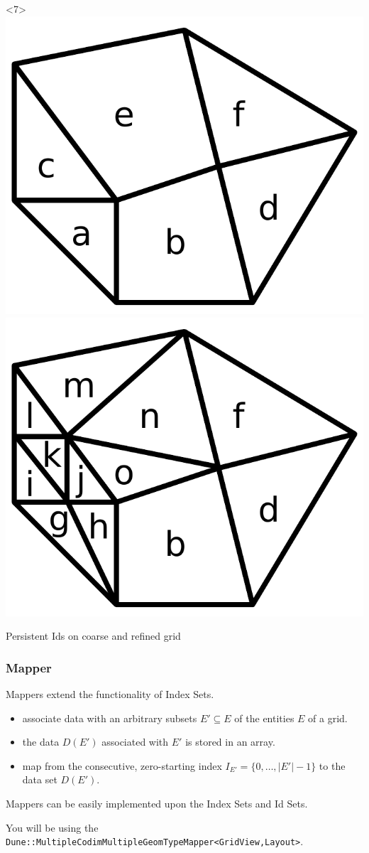 \documentclass[ignorenonframetext,11pt]{beamer}
\theoremstyle{definition}
\begin{document}
\begin{frame}
\begin{overlayarea}{\linewidth}{0.45\linewidth}
\begin{center}
    \begin{onlyenv}<7>
      \includegraphics[width=0.4\linewidth]{index-id0}
      \hfill
      \includegraphics[width=0.4\linewidth]{index-id1}\par
      Persistent Ids on coarse and refined grid\par
    \end{onlyenv}

    \end{center}
  \end{overlayarea}
\end{frame}

\begin{frame} \frametitle{Mapper}
  Mappers extend the functionality of Index Sets.

  \begin{itemize}
  \item associate data with an arbitrary subsets $E'\subseteq E$
    of the entities $E$ of a grid.
  \item the data $D(E')$ associated with
    $E'$ is stored in an array.
  \item map from the consecutive, zero-starting index $I_{E'} =
    \{0, \ldots, |E'|-1\}$ to the data set $D(E')$.
  \end{itemize}

  Mappers can be easily implemented upon the Index Sets and Id Sets.

  You will be using the
  \footnotesize
  \lstinline!Dune::MultipleCodimMultipleGeomTypeMapper<GridView,Layout>!.
\end{frame}
\end{document}
